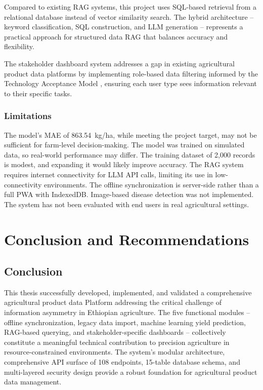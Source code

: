 \documentclass[12pt,a4paper,oneside]{report}
\begin{document}
Compared to existing RAG systems, this project uses SQL-based retrieval from a relational database instead of vector similarity search. The hybrid architecture -- keyword classification, SQL construction, and LLM generation -- represents a practical approach for structured data RAG that balances accuracy and flexibility.

The stakeholder dashboard system addresses a gap in existing agricultural product data platforms by implementing role-based data filtering informed by the Technology Acceptance Model \cite{davis1989}, ensuring each user type sees information relevant to their specific tasks.

\subsection{Limitations}
The model's MAE of 863.54~kg/ha, while meeting the project target, may not be sufficient for farm-level decision-making. The model was trained on simulated data, so real-world performance may differ. The training dataset of 2,000 records is modest, and expanding it would likely improve accuracy. The RAG system requires internet connectivity for LLM API calls, limiting its use in low-connectivity environments. The offline synchronization is server-side rather than a full PWA with IndexedDB. Image-based disease detection was not implemented. The system has not been evaluated with end users in real agricultural settings.

\clearpage
\chapter{Conclusion and Recommendations}

\section{Conclusion}
This thesis successfully developed, implemented, and validated a comprehensive agricultural product data Platform addressing the critical challenge of information asymmetry in Ethiopian agriculture. The five functional modules -- offline synchronization, legacy data import, machine learning yield prediction, RAG-based querying, and stakeholder-specific dashboards -- collectively constitute a meaningful technical contribution to precision agriculture in resource-constrained environments. The system's modular architecture, comprehensive API surface of 108 endpoints, 15-table database schema, and multi-layered security design provide a robust foundation for agricultural product data management.
\end{document}
